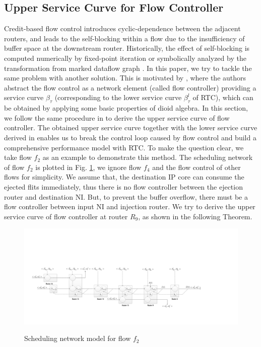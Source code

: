 \documentclass[10pt,journal]{IEEEtran}
\begin{document}
\subsection{Upper Service Curve for Flow Controller}\label{flowcontrol}
Credit-based flow control introduces cyclic-dependence between the adjacent routers, and leads to the self-blocking within a flow due to the insufficiency of buffer space at the downstream router. Historically, the effect of self-blocking is computed numerically by fixed-point iteration \cite{schioler2005network} or symbolically analyzed by the transformation from marked dataflow graph \cite{Thiele:2009:MPA:1629335.1629353}. In this paper, we try to tackle the same problem with another solution. This is motivated by \cite{qian2009analysis}, where the authors abstract the flow control as a network element (called flow controller) providing a service curve $\beta_{\tau}$ (corresponding to the lower service curve $\beta_\tau^l$ of RTC), which can be obtained by applying some basic properties of dioid algebra. In this section, we follow the same procedure in \cite{qian2009analysis} to derive the upper service curve of flow controller. The obtained upper service curve together with the lower service curve derived in \cite{qian2009analysis} enables us to break the control loop caused by flow control and build a comprehensive performance model with RTC. To make the question clear, we take flow $f_2$ as an example to demonstrate this method. The scheduling network of flow $f_2$ is plotted in Fig. \ref{f2}, we ignore flow $f_4$ and the flow control of other flows for simplicity. We assume that, the destination IP core can consume the ejected flits immediately, thus there is no flow controller between the ejection router and destination NI. But, to prevent the buffer overflow, there must be a flow controller between input NI and injection router. We try to derive the upper service curve of flow controller at router $R_9$, as shown in the following Theorem.
\begin{figure}
  \centering
  \includegraphics[scale=0.35]{figures/f2.pdf}\\
  \caption{Scheduling network model for flow $f_2$}\label{f2}
\end{figure}
\end{document}
